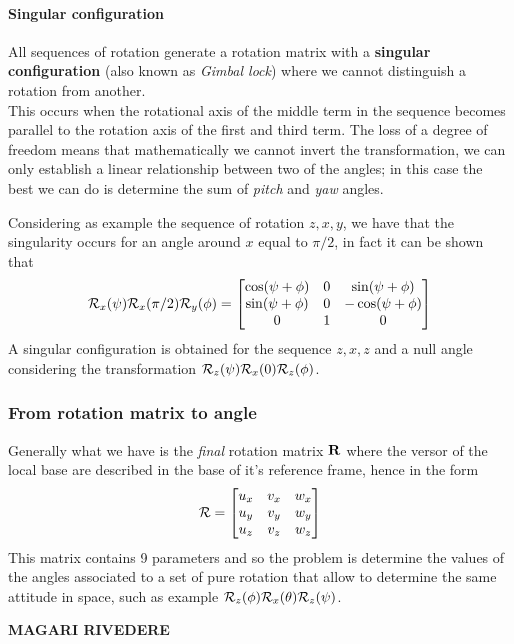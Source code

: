 		\paragraph{Singular configuration} All sequences of rotation generate a rotation matrix with a \textbf{singular configuration} (also known as \textit{Gimbal lock}) where we cannot distinguish a rotation from another. \\
		This occurs when the rotational axis of the middle term in the sequence becomes parallel to the rotation axis of the first and third term. The loss of a degree of freedom means that mathematically we cannot invert the transformation, we can only establish a linear relationship between two of the angles; in this case the best we can do is determine the sum of \textit{pitch} and \textit{yaw} angles.
		
		Considering as example the sequence of rotation $z,x,y$, we have that the singularity occurs for an angle around $x$ equal to $\pi/2$, in fact it can be shown that
		\[ \mathcal R_x(\psi) \mathcal R_x(\pi/2) \mathcal R_y(\phi) = \begin{bmatrix} \cos(\psi+\phi) & 0 & \sin(\psi + \phi) \\ \sin(\psi + \phi) & 0 & -\cos(\psi + \phi) \\ 0 & 1 & 0 \end{bmatrix} \]
		A singular configuration is obtained for the sequence $z,x,z$ and a null angle considering the transformation $\mathcal R_z(\psi) \mathcal R_x(0) \mathcal R_z(\phi)$.
	
	\subsubsection{From rotation matrix to angle}
		Generally what we have is the \textit{final} rotation matrix $\mathbf{R}$ where the versor of the local base are described in the base of it's reference frame, hence in the form
		\begin{equation}
			\mathcal R = \begin{bmatrix} u_x & v_x & w_x \\ u_y & v_y & w_y \\ u_z & v_z & w_z  \end{bmatrix}
		\end{equation}
		This matrix contains 9 parameters and so the problem is determine the values of the angles associated to a set of pure rotation that allow to determine the same attitude in space, such as example $\mathcal R_z(\phi) \mathcal R_x(\theta)\mathcal R_z(\psi)$.
		
		\textbf{MAGARI RIVEDERE}
		
